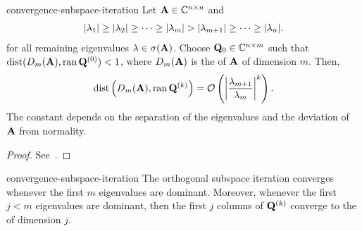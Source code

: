 \begin{Theorem}{convergence-subspace-iteration}
  Let $\mata\in\Cnn$ and
  \begin{gather}
    \abs{\lambda_1} \ge
    \abs{\lambda_2} \ge \dots \ge
    \abs{\lambda_m}>\abs{\lambda_{m+1}} \ge \dots \ge \abs{\lambda_n}.
  \end{gather}
  for all remaining eigenvalues $\lambda\in\sigma(\mata)$. Choose
  $\matq_0 \in \C^{n\times m}$ such that
  $\dist(D_m(\mata),\ran{\matq^{(0)}}) < 1$, where $D_m(\mata)$ is the
   of $\mata$ of dimension
  $m$. Then,
  \begin{gather}
    \dist\left(D_m(\mata),\ran{\matq^{(k)}}\right)
    = \bigo \left(\abs*{\frac{\lambda_{m+1}}{\lambda_m}}^k\right).
  \end{gather}
  The constant depends on the separation of the eigenvalues and the deviation of $\mata$ from normality.
\end{Theorem}

\begin{proof}
  See~\cite[Theorem 7.3-1]{GolubVanLoan83}.
\end{proof}

\begin{Corollary}{convergence-subspace-iteration}
  The orthogonal subspace iteration converges whenever the first $m$
  eigenvalues are dominant. Moreover, whenever the first $j<m$ eigenvalues are dominant, then the first $j$ columns of $\matq^{(k)}$ converge to the  of dimension $j$.
\end{Corollary}

